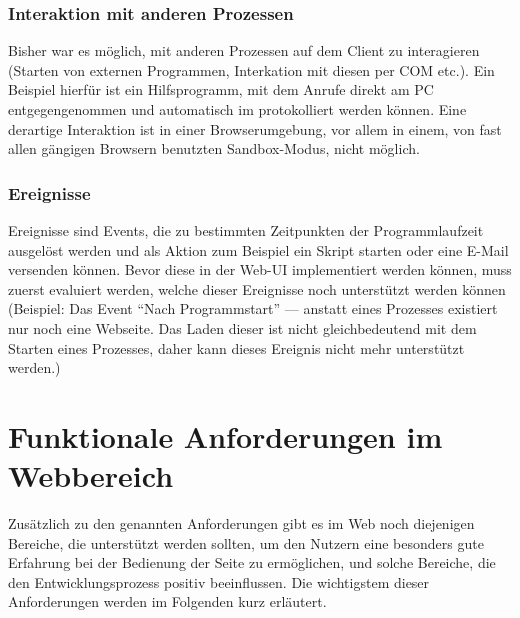 \subsubsection{Interaktion mit anderen Prozessen}
 Bisher war es möglich, mit anderen Prozessen auf dem Client zu interagieren (Starten von externen Programmen, Interkation mit diesen per \gls{COM} etc.). Ein Beispiel hierfür ist ein Hilfsprogramm, mit dem Anrufe direkt am PC entgegengenommen und automatisch im  protokolliert werden können. Eine derartige Interaktion ist in einer Browserumgebung, vor allem in einem, von fast allen gängigen Browsern benutzten Sandbox-Modus, nicht möglich.

\subsubsection{Ereignisse} 
Ereignisse sind Events, die zu bestimmten Zeitpunkten der Programmlaufzeit ausgelöst werden und als Aktion zum Beispiel ein Skript starten oder eine E-Mail versenden können. Bevor diese in der Web-UI implementiert werden können, muss zuerst evaluiert werden, welche dieser Ereignisse noch unterstützt werden können (Beispiel: Das Event ``Nach Programmstart'' --- anstatt eines Prozesses existiert nur noch eine Webseite. Das Laden dieser ist nicht gleichbedeutend mit dem Starten eines Prozesses, daher kann dieses Ereignis nicht mehr unterstützt werden.)

\section{Funktionale Anforderungen im Webbereich}
Zusätzlich zu den genannten Anforderungen gibt es im Web noch diejenigen Bereiche, die unterstützt werden sollten, um den Nutzern eine besonders gute Erfahrung bei der Bedienung der Seite zu ermöglichen, und solche Bereiche, die den Entwicklungsprozess positiv beeinflussen. Die wichtigstem dieser Anforderungen werden im Folgenden kurz erläutert. 


